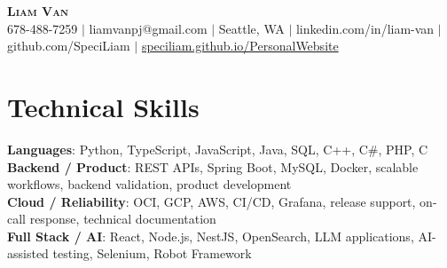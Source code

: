 \documentclass[letterpaper,11pt]{article}
\begin{document}

%
\begin{center}
    \textbf{\Huge \scshape Liam Van} \\ \vspace{1pt}
    \small 678-488-7259 $|$ \small {liamvanpj@gmail.com} $|$ Seattle, WA
 {{$|$ linkedin.com/in/liam-van} {$|$ github.com/SpeciLiam} {$|$ \href{https://speciliam.github.io/PersonalWebsite}{speciliam.github.io/PersonalWebsite}}}

\end{center}

\section{Technical Skills}
 \begin{itemize}[leftmargin=0.15in, label={}]
    \small{\item{
     \textbf{Languages}{: Python, TypeScript, JavaScript, Java, SQL, C++, C\#, PHP, C} \\
     \textbf{Backend / Product}{: REST APIs, Spring Boot, MySQL, Docker, scalable workflows, backend validation, product development} \\
     \textbf{Cloud / Reliability}{: OCI, GCP, AWS, CI/CD, Grafana, release support, on-call response, technical documentation} \\
     \textbf{Full Stack / AI}{: React, Node.js, NestJS, OpenSearch, LLM applications, AI-assisted testing, Selenium, Robot Framework} \\
    }}
 \end{itemize}
%
\end{document}
